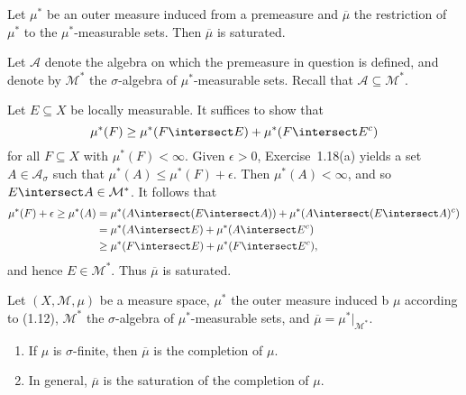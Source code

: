 \documentclass[article, a4paper, 11pt, oneside]{memoir}
\numberwithin{equation}{chapter}
\newcommand{\calM}{\mathcal{M}}
\newcommand{\calA}{\mathcal{A}}
\begin{document}
\begin{exerciseframed*}[21]
    Let $\mu^*$ be an outer measure induced from a premeasure and $\overline\mu$ the restriction of $\mu^*$ to the $\mu^*$-measurable sets. Then $\overline\mu$ is saturated.
\end{exerciseframed*}
%
Let $\calA$ denote the algebra on which the premeasure in question is defined, and denote by $\calM^*$ the $\sigma$-algebra of $\mu^*$-measurable sets. Recall that $\calA \subseteq \calM^*$.

Let $E \subseteq X$ be locally measurable. It suffices to show that
%
\begin{equation*}
    \mu^*(F)
        \geq \mu^*(F \intersect E) + \mu^*(F \intersect E^c)
\end{equation*}
%
for all $F \subseteq X$ with $\mu^*(F) < \infty$. Given $\epsilon   > 0$, Exercise~1.18(a) yields a set $A \in \calA_\sigma$ such that $\mu^*(A) \leq \mu^*(F) + \epsilon$. Then $\mu^*(A) < \infty$, and so $E \intersect A \in \calM^*$. It follows that
%
\begin{align*}
    \mu^*(F) + \epsilon
        \geq \mu^*(A)
        &= \mu^*(A \intersect (E \intersect A))
          + \mu^*(A \intersect (E \intersect A)^c) \\
        &= \mu^*(A \intersect E) + \mu^*(A \intersect E^c) \\
        &\geq \mu^*(F \intersect E) + \mu^*(F \intersect E^c),
\end{align*}
%
and hence $E \in \calM^*$. Thus $\overline\mu$ is saturated.


\begin{exerciseframed*}[22]
    Let $(X,\calM,\mu)$ be a measure space, $\mu^*$ the outer measure induced b $\mu$ according to (1.12), $\calM^*$ the $\sigma$-algebra of $\mu^*$-measurable sets, and $\overline\mu = \mu^*|_{\calM^*}$.
    \begin{enumerate}
        \item If $\mu$ is $\sigma$-finite, then $\overline\mu$ is the completion of $\mu$.
        \item In general, $\overline\mu$ is the saturation of the completion of $\mu$.
    \end{enumerate}
\end{exerciseframed*}
\end{document}

